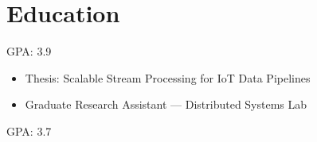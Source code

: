 
\section{Education}



GPA: 3.9


\begin{itemize}

  \item Thesis: Scalable Stream Processing for IoT Data Pipelines

  \item Graduate Research Assistant — Distributed Systems Lab

\end{itemize}





GPA: 3.7





